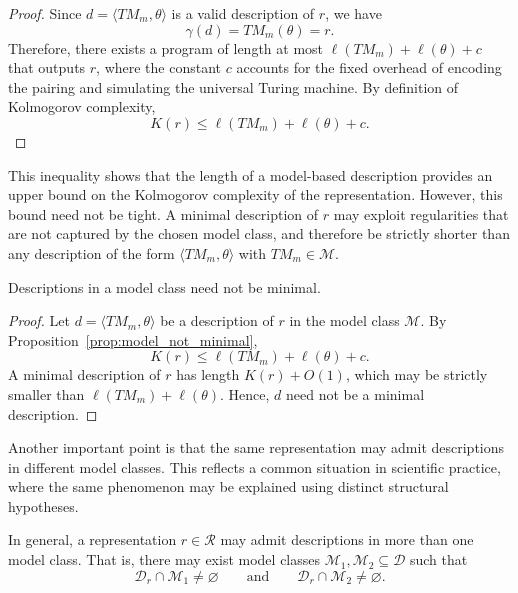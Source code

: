 \begin{proof}
Since \(d = \langle TM_m, \theta \rangle\) is a valid description of \(r\), we have
\[
\gamma(d) = TM_m(\theta) = r.
\]
Therefore, there exists a program of length at most \(\ell(TM_m) + \ell(\theta) + c\) that outputs \(r\), where the constant \(c\) accounts for the fixed overhead of encoding the pairing and simulating the universal Turing machine. By definition of Kolmogorov complexity,
\[
K(r) \leq \ell(TM_m) + \ell(\theta) + c.
\]
\end{proof}

This inequality shows that the length of a model-based description provides an upper bound on the Kolmogorov complexity of the representation. However, this bound need not be tight. A minimal description of \(r\) may exploit regularities that are not captured by the chosen model class, and therefore be strictly shorter than any description of the form \(\langle TM_m, \theta \rangle\) with \(TM_m \in \mathcal{M}\).

\begin{corollary}
Descriptions in a model class need not be minimal.
\end{corollary}

\begin{proof}
Let \(d = \langle TM_m, \theta \rangle\) be a description of \(r\) in the model class \(\mathcal{M}\). By Proposition~\ref{prop:model_not_minimal},
\[
K(r) \leq \ell(TM_m) + \ell(\theta) + c.
\]
A minimal description of \(r\) has length \(K(r) + O(1)\), which may be strictly smaller than \(\ell(TM_m) + \ell(\theta)\). Hence, \(d\) need not be a minimal description.
\end{proof}

Another important point is that the same representation may admit descriptions in different model classes. This reflects a common situation in scientific practice, where the same phenomenon may be explained using distinct structural hypotheses.

\begin{proposition}
\label{prop:representation_multiple_model_classes}
In general, a representation \(r \in \mathcal{R}\) may admit descriptions in more than one model class. That is, there may exist model classes \(\mathcal{M}_1, \mathcal{M}_2 \subseteq \mathcal{D}\) such that
\[
\mathcal{D}_r \cap \mathcal{M}_1 \neq \varnothing
\qquad\text{and}\qquad
\mathcal{D}_r \cap \mathcal{M}_2 \neq \varnothing.
\]
\end{proposition}

